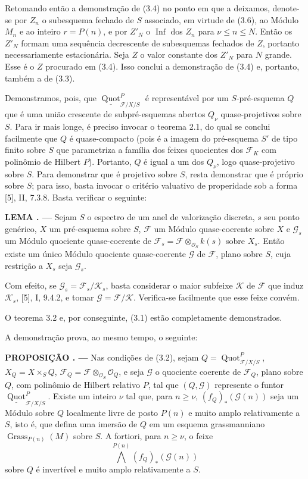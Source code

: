 \documentclass[11pt,twoside,openany]{book}
\numberwithin{equation}{section}
\newcommand{\src}[1]{%
  \phantomsection\hypertarget{src:#1}{}%
  \marginpar{\raggedleft\footnotesize\sffamily #1}%
}
\theoremstyle{plain}
\theoremstyle{definition}
\theoremstyle{remark}
\newcommand{\result}[2]{%
  \par\medskip\noindent\textbf{#1%
  \if\relax\detokenize{#2}\relax\else\space#2\fi. ---}\enspace
}
\newcommand{\FgaUnitKey}{frontmatter}
\renewcommand{\src}[1]{%
  \phantomsection\hypertarget{src:\FgaUnitKey:#1}{}%
  \marginpar{\raggedleft\footnotesize\sffamily #1}%
}
\begin{document}
Retomando então a demonstração de (3.4) no ponto em que a deixamos, denote-se
por $Z_n$ o subesquema fechado de $S$ associado, em virtude de (3.6), ao
Módulo $M_n$ e ao inteiro $r=P(n)$, e por $Z'_N$ o
$\operatorname{Inf}$ dos $Z_n$ para $\nu\leq n\leq N$. Então os $Z'_N$
formam uma sequência decrescente de subesquemas fechados de $Z$, portanto
necessariamente estacionária. Seja $Z$ o valor constante dos $Z'_N$ para $N$
grande. Esse é o $Z$ procurado em (3.4). Isso conclui a demonstração de (3.4)
e, portanto, também a de (3.3).

Demonstramos, pois, que
$\underline{\operatorname{Quot}}^P_{\mathcal F/X/S}$ é representável por um
$S$-pré-esquema $Q$ que é uma união crescente de subpré-esquemas abertos
$Q_\nu$ quase-projetivos sobre $S$. Para ir mais longe, é preciso invocar o
teorema 2.1, do qual se conclui facilmente que $Q$ é quase-compacto (pois é a
imagem do pré-esquema $S'$ de tipo finito sobre $S$ que parametriza a família
dos feixes quocientes dos $\mathcal F_K$ com polinômio de Hilbert $P$).
Portanto, $Q$ é igual a um dos $Q_\nu$, logo quase-projetivo sobre $S$. Para
demonstrar que é projetivo sobre $S$, resta demonstrar que é próprio sobre
$S$; para isso, basta invocar o critério valuativo de properidade sob a forma
[5], II, 7.3.8. Basta verificar o seguinte:

\result{LEMA}{3.7} Sejam $S$ o espectro de um anel de valorização discreta,
$s$ seu ponto genérico, $X$ um pré-esquema sobre $S$, $\mathcal F$ um Módulo
quase-coerente sobre $X$ e $\mathcal G_s$ um Módulo quociente quase-coerente
de $\mathcal F_s=\mathcal F\otimes_{\mathcal O_S}k(s)$ sobre $X_s$. Então
existe um único Módulo quociente quase-coerente $\mathcal G$ de $\mathcal F$,
plano sobre $S$, cuja restrição a $X_s$ seja $\mathcal G_s$.
\src{265}
Com efeito, se $\mathcal G_s=\mathcal F_s/\mathcal K_s$, basta considerar o
maior subfeixe $\mathcal K$ de $\mathcal F$ que induz $\mathcal K_s$, [5],
I, 9.4.2, e tomar $\mathcal G=\mathcal F/\mathcal K$. Verifica-se facilmente
que esse feixe convém.

O teorema 3.2 e, por conseguinte, (3.1) estão completamente demonstrados.

A demonstração prova, ao mesmo tempo, o seguinte:

\result{PROPOSIÇÃO}{3.8} Nas condições de (3.2), sejam
$Q=\operatorname{Quot}^P_{\mathcal F/X/S}$, $X_Q=X\times_SQ$,
$\mathcal F_Q=\mathcal F\otimes_{\mathcal O_S}\mathcal O_Q$, e seja
$\mathcal G$ o quociente coerente de $\mathcal F_Q$, plano sobre $Q$, com
polinômio de Hilbert relativo $P$, tal que $(Q,\mathcal G)$ represente o
funtor $\underline{\operatorname{Quot}}^P_{\mathcal F/X/S}$. Existe um
inteiro $\nu$ tal que, para $n\geq\nu$,
$(f_Q)_*(\mathcal G(n))$ seja um Módulo sobre $Q$ localmente livre de posto
$P(n)$ e muito amplo relativamente a $S$, isto é, que defina uma imersão de
$Q$ em um esquema grassmanniano $\operatorname{Grass}_{P(n)}(M)$ sobre $S$.
A fortiori, para $n\geq\nu$, o feixe
\[
\bigwedge^{P(n)}(f_Q)_*(\mathcal G(n))
\]
sobre $Q$ é invertível e muito amplo relativamente a $S$.
\end{document}
